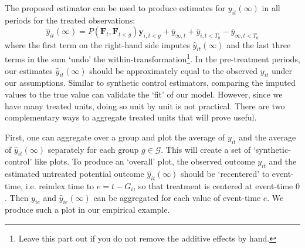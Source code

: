 \documentclass[12pt]{article}
\begin{document}
\begin{remark}\label{sec:plotting_estimates}

The proposed estimator can be used to produce estimates for $y_{it}(\infty)$ in all periods for the treated observations:
\begin{equation}
  \hat{y}_{it}(\infty) = P(\bm{F}_t, \bm{F}_{t < g}) \bm y_{i, t<g} + \overline{y}_{\infty, t} + \overline{y}_{i, t<T_0} - \overline{y}_{\infty, t<T_0}
\end{equation}
where the first term on the right-hand side imputes $\hat{y}_{it}(\infty)$ and the last three terms in the sum `undo' the within-transformation\footnote{Leave this part out if you do not remove the additive effects by hand.}. In the pre-treatment periods, our estimates $\hat{y}_{it}(\infty)$ should be approximately equal to the observed $y_{it}$ under our assumptions. Similar to synthetic control estimators, comparing the imputed values to the true value can validate the `fit' of our model. However, since we have many treated units, doing so unit by unit is not practical. There are two complementary ways to aggregate treated units that will prove useful. 

First, one can aggregate over a group and plot the average of $y_{it}$ and the average of $\hat{y}_{it}(\infty)$ separately for each group $g \in \mathcal{G}$. This will create a set of `synthetic-control' like plots. To produce an `overall' plot, the observed outcome $y_{it}$ and the estimated untreated potential outcome $\hat{y}_{it}(\infty)$ should be `recentered' to event-time, i.e. reindex time to $e = t - G_i$, so that treatment is centered at event-time $0$. Then $y_{ie}$ and $\hat{y}_{ie}(\infty)$ can be aggregated for each value of event-time $e$. We produce such a plot in our empirical example.

\end{remark}
\end{document}

